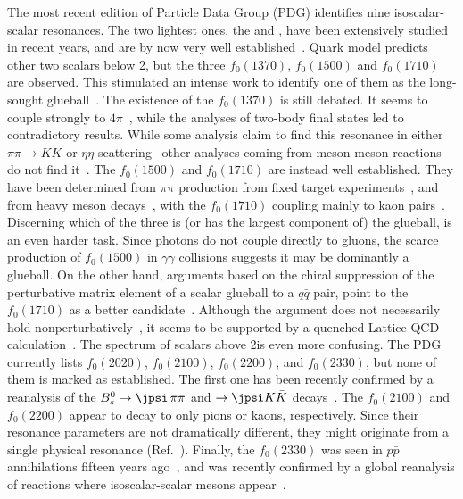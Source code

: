 The most recent edition of Particle Data Group (PDG) identifies nine  isoscalar-scalar resonances. The two lightest ones, the \sig and \fzero, have been extensively studied in recent years, and are by now very well established~\cite{Ananthanarayan:2000ht,Colangelo:2001df,GarciaMartin:2011cn,Moussallam:2011zg,Caprini:2005zr,GarciaMartin:2011nna,Pelaez:2015qba}.
Quark model predicts other two scalars below 2\gev, but the three $f_0(1370)$, $f_0(1500)$ and $f_0(1710)$ are observed. This stimulated an intense work to identify one of them as the long-sought glueball~\cite{Chanowitz:1980gu,Amsler:1995td,Amsler:1995tu,Lee:1999kv,Giacosa:2005zt,Giacosa:2005qr,Albaladejo:2008qa,Janowski:2014ppa}. 
The existence of the $f_0(1370)$ is still debated. 
It seems to couple strongly to $4\pi$~\cite{Abele:2001js,Abele:2001pv}, while the analyses of two-body final states led to contradictory results. While some analysis claim to find this resonance in either $\pi \pi \to K \bar K$ or $\eta \eta$ scattering~\cite{Amsler:1992rx,Anisovich:1994bi,Amsler:1995bz,Gaspero:1992gu,Lanaro:1993km,Amsler:1994rv,Cohen:1980cq,Etkin:1982se} other analyses coming from meson-meson reactions do not find it~\cite{Hyams:1973zf,Grayer:1974cr,Hyams:1975mc,Estabrooks:1978de,Adolph:2015tqa}.
The $f_0(1500)$  and  $f_0(1710)$  are instead well established.
They have been determined from $\pi\pi$ production from fixed target experiments~\cite{Hyams:1973zf,Grayer:1974cr,Hyams:1975mc,clas:2017vxx}, and from heavy meson decays~\cite{Ablikim:2013hq,Dobbs:2015dwa,Ablikim:2018izx,dArgent:2017gzv,Lees:2012kxa,Ropertz:2018stk}, with the $f_0(1710)$  coupling mainly to kaon pairs~\cite{Barberis:1999am,Uehara:2013mbo,Ablikim:2018izx}.
Discerning which of the three is (or has the largest component of) the glueball, is an even harder task.
Since photons do not couple directly to gluons, the scarce production of $f_0(1500)$ in $\gamma\gamma$ collisions suggests it may be dominantly a   glueball. On the other hand, arguments based on the chiral suppression of the  perturbative matrix element of a scalar glueball to a $q\bar q$ pair, point to the $f_0(1710)$ as a better candidate~\cite{Chanowitz:2005du,Albaladejo:2008qa}. Although the argument does not necessarily hold nonperturbatively~\cite{Chao:2005si,Chanowitz:2007ma}, it seems to be supported by a quenched Lattice QCD calculation~\cite{Sexton:1995kd}.
The spectrum of scalars above 2\gev is even more confusing. The PDG currently lists $f_0(2020)$, $f_0(2100)$, $f_0(2200)$,  and $f_0(2330)$, but none of them is marked as established. The first one has been 
recently confirmed by a reanalysis of the $B_s^0 \to \jpsi \,\pi\pi$ and $\to \jpsi K \bar K$ decays~\cite{Ropertz:2018stk}.
The $f_0(2100)$ and $f_0(2200)$ appear to decay to only pions or kaons, respectively.
Since their resonance parameters are not dramatically different, they might originate from a single physical resonance (\cf Ref.~\cite{JPAC:2018zyd}).
Finally, the $f_0(2330)$ was seen in $p\bar p$ annihilations fifteen years ago~\cite{Anisovich:2000ut,Bugg:2004rj}, and was recently confirmed by a global reanalysis of reactions where isoscalar-scalar mesons appear~\cite{Sarantsev:2021ein}. 

